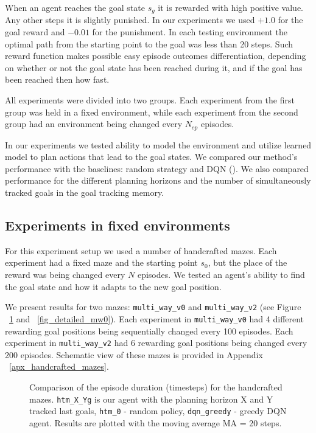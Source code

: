 \documentclass[a4paper,twoside]{article}
\begin{document}
When an agent reaches the goal state $s_g$ it is rewarded with high positive value. Any other steps it is slightly punished. In our experiments we used $+1.0$ for the goal reward and $-0.01$ for the punishment. In each testing environment the optimal path from the starting point to the goal was less than 20 steps. Such reward function makes possible easy episode outcomes differentiation, depending on whether or not the goal state has been reached during it, and if the goal has been reached then how fast.

All experiments were divided into two groups. Each experiment from the first group was held in a fixed environment, while each experiment from the second group had an environment being changed every $N_{ep}$ episodes.

In our experiments we tested ability to model the environment and utilize learned model to plan actions that lead to the goal states. We compared our method's performance with the baselines: random strategy and DQN (\cite{Mnih_2015_Atari}). We also compared performance for the different planning horizons and the number of simultaneously tracked goals in the goal tracking memory.

\subsection{Experiments in fixed environments}

For this experiment setup we used a number of handcrafted mazes. Each experiment had a fixed maze and the starting point $s_0$, but the place of the reward was being changed every $N$ episodes. We tested an agent's ability to find the goal state and how it adapts to the new goal position.

We present results for two mazes: \texttt{multi\_way\_v0} and \texttt{multi\_way\_v2} (see Figure ~\ref{fig_comparison_mw} and ~\ref{fig_detailed_mw0}). Each experiment in \texttt{multi\_way\_v0} had 4 different rewarding goal positions being sequentially changed every 100 episodes. Each experiment in \texttt{multi\_way\_v2} had 6 rewarding goal positions being changed every 200 episodes. Schematic view of these mazes is provided in Appendix ~\ref{apx_handcrafted_mazes}.

\begin{figure}
  \centering
  \begin{minipage}{.49\linewidth}
    
  \end{minipage}
  \begin{minipage}{.49\linewidth}
    
  \end{minipage}
  \caption{Comparison of the episode duration (timesteps) for the handcrafted mazes. \texttt{htm\_X\_Yg} is our agent with the planning horizon X and Y tracked last goals, \texttt{htm\_0} - random policy, \texttt{dqn\_greedy} - greedy DQN agent. Results are plotted with the moving average MA = 20 steps.} \label{fig_comparison_mw}
\end{figure}
\end{document}
